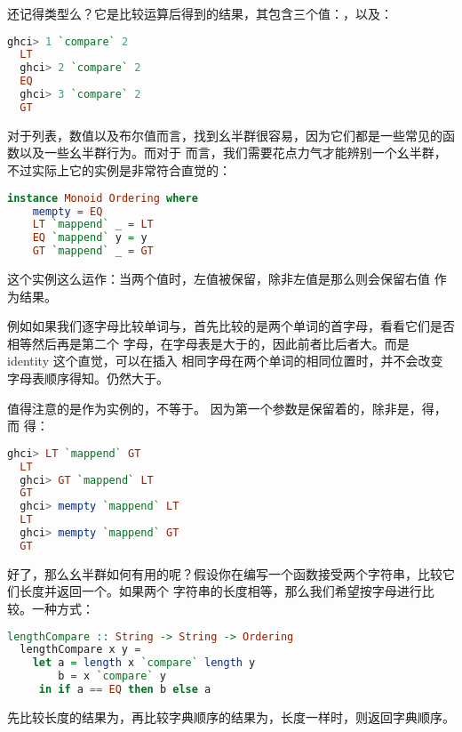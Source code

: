 \documentclass[./main.tex]{subfiles}
\begin{document}
还记得类型么？它是比较运算后得到的结果，其包含三个值：，以及：

\begin{lstlisting}[language=Haskell]
  ghci> 1 `compare` 2
  LT
  ghci> 2 `compare` 2
  EQ
  ghci> 3 `compare` 2
  GT
\end{lstlisting}

对于列表，数值以及布尔值而言，找到幺半群很容易，因为它们都是一些常见的函数以及一些幺半群行为。而对于
而言，我们需要花点力气才能辨别一个幺半群，不过实际上它的实例是非常符合直觉的：

\begin{lstlisting}[language=Haskell]
  instance Monoid Ordering where
    mempty = EQ
    LT `mappend` _ = LT
    EQ `mappend` y = y
    GT `mappend` _ = GT
\end{lstlisting}

这个实例这么运作：当两个值时，左值被保留，除非左值是那么则会保留右值
作为结果。

例如如果我们逐字母比较单词与，首先比较的是两个单词的首字母，看看它们是否相等然后再是第二个
字母，在字母表是大于的，因此前者比后者大。而是 identity 这个直觉，可以在插入
相同字母在两个单词的相同位置时，并不会改变字母表顺序得知。仍然大于。

值得注意的是作为实例的，不等于。
因为第一个参数是保留着的，除非是，得，而
得：

\begin{lstlisting}[language=Haskell]
  ghci> LT `mappend` GT
  LT
  ghci> GT `mappend` LT
  GT
  ghci> mempty `mappend` LT
  LT
  ghci> mempty `mappend` GT
  GT
\end{lstlisting}

好了，那么幺半群如何有用的呢？假设你在编写一个函数接受两个字符串，比较它们长度并返回一个。如果两个
字符串的长度相等，那么我们希望按字母进行比较。一种方式：

\begin{lstlisting}[language=Haskell]
  lengthCompare :: String -> String -> Ordering
  lengthCompare x y =
    let a = length x `compare` length y
        b = x `compare` y
     in if a == EQ then b else a
\end{lstlisting}

先比较长度的结果为，再比较字典顺序的结果为，长度一样时，则返回字典顺序。
\end{document}
